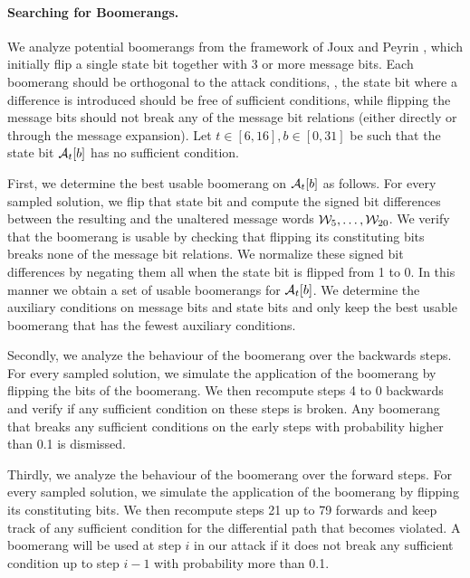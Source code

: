 \paragraph{Searching for Boomerangs.}
We analyze potential boomerangs from the framework of Joux and Peyrin \cite{DBLP:conf/crypto/JouxP07}, which initially flip a single state bit together with 3 or more message bits.
Each boomerang should be orthogonal to the attack conditions, \ie, the state bit where a difference is introduced
should be free of sufficient conditions, while flipping the message bits should not break any of the message bit relations
(either directly or through the message expansion).
Let $t\in[6,16], b\in[0,31]$ be such that the state bit $\mathcal{A}_t[b]$ has no sufficient condition.

First, we determine the best usable boomerang on $\mathcal{A}_t[b]$ as follows.
For every sampled solution, we flip that state bit and compute the signed bit differences between the resulting and the unaltered message words $\mathcal{W}_5,\ldots,\mathcal{W}_{20}$.
We verify that the boomerang is usable by checking that flipping its constituting bits breaks none of the message bit relations.
We normalize these signed bit differences by negating them all when the state bit is flipped from 1 to 0.
In this manner we obtain a set of usable boomerangs for $\mathcal{A}_t[b]$.
We determine the auxiliary conditions on message bits and state bits and only keep the best usable boomerang that has the fewest auxiliary conditions.

Secondly, we analyze the behaviour of the boomerang over the backwards steps.
For every sampled solution, we simulate the application of the boomerang by flipping the bits of the boomerang.
We then recompute steps 4 to 0 backwards and verify if any sufficient condition on these steps is broken.
Any boomerang that breaks any sufficient conditions on the early steps with probability higher than 0.1 is dismissed.

Thirdly, we analyze the behaviour of the boomerang over the forward steps.
For every sampled solution, we simulate the application of the boomerang by flipping its constituting bits.
We then recompute steps 21 up to 79 forwards and keep track of any sufficient condition for the differential path that becomes violated.
A boomerang will be used at step $i$ in our attack if it does not break any sufficient condition up to step $i-1$ with probability more than 0.1.

